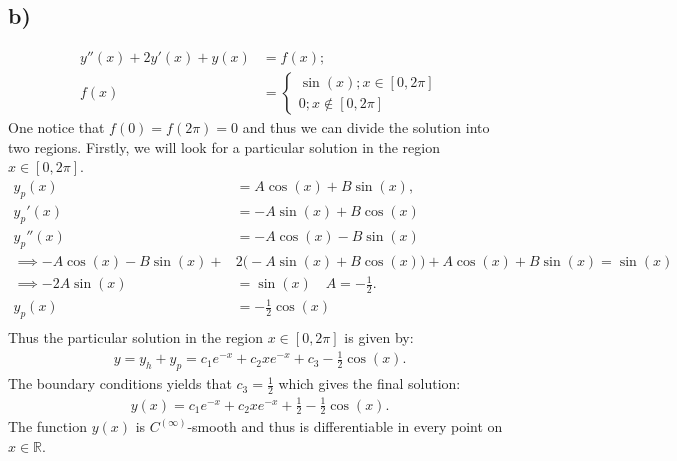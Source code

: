 \documentclass{article}
\begin{document}
\subsection*{b)}
\begin{align*}
    y''(x) + 2y'(x) + y(x) &= f(x);\\
    f(x)&= \begin{cases}
        \sin(x); x\in[0,2\pi]\\
        0; x\notin [0, 2\pi]
    \end{cases}
\end{align*}One notice that $f(0) = f(2\pi) = 0$ and thus we can divide the solution into two regions. Firstly, we will look for a particular solution in the region $x\in[0,2\pi]$.
\begin{align*}
    y_p(x) &= A\cos(x) + B\sin(x),\\
    y_p'(x) &= -A\sin(x) + B\cos(x)\\
    y_p''(x) &= -A\cos(x) - B\sin(x)\\
    \implies -A\cos(x) - B\sin(x) + &2\Big(-A\sin(x) + B\cos(x)\Big) + A\cos(x) + B\sin(x) = \sin(x)\\
    \implies -2A\sin(x) &= \sin(x)\quad A = -\frac{1}{2}.\\
    y_p(x) &= -\frac{1}{2}\cos(x)\\
\end{align*}Thus the particular solution in the region $x\in[0,2\pi]$ is given by:
\begin{align*}
    y = y_h + y_p = c_1 e^{-x} + c_2 x e^{-x} + c_3 - \frac{1}{2}\cos(x).
\end{align*} The boundary conditions yields that $c_3 = \frac{1}{2}$ which gives the final solution:
\begin{align*}
    y(x) = c_1 e^{-x} + c_2 x e^{-x} + \frac{1}{2} - \frac{1}{2}\cos(x).
\end{align*} The function $y(x)$ is $C^{(\infty)}$-smooth and thus is differentiable in every point on $x\in\mathbb{R}$.
\end{document}
